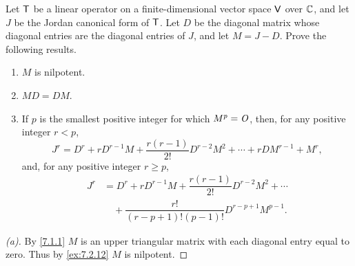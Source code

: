 \begin{ex}\label{ex:7.2.18}
  Let \(\mathsf{T}\) be a linear operator on a finite-dimensional vector space \(\mathsf{V}\) over \(\mathbb{C}\), and let \(J\) be the Jordan canonical form of \(\mathsf{T}\).
  Let \(D\) be the diagonal matrix whose diagonal entries are the diagonal entries of \(J\), and let \(M = J - D\).
  Prove the following results.
  \begin{enumerate}
    \item \(M\) is nilpotent.
    \item \(MD = DM\).
    \item If \(p\) is the smallest positive integer for which \(M^p = \mathit{O}\), then, for any positive integer \(r < p\),
          \[
            J^r = D^r + r D^{r - 1} M + \dfrac{r (r - 1)}{2!} D^{r - 2} M^2 + \cdots + r D M^{r - 1} + M^r,
          \]
          and, for any positive integer \(r \geq p\),
          \begin{align*}
            J^r & = D^r + r D^{r - 1} M + \dfrac{r (r - 1)}{2!} D^{r - 2} M^2 + \cdots \\
                & \quad + \dfrac{r!}{(r - p + 1)! (p - 1)!} D^{r - p + 1} M^{p - 1}.
          \end{align*}
  \end{enumerate}
\end{ex}

\begin{proof}[(a)]
  By \cref{7.1.1} \(M\) is an upper triangular matrix with each diagonal entry equal to zero.
  Thus by \cref{ex:7.2.12} \(M\) is nilpotent.
\end{proof}

